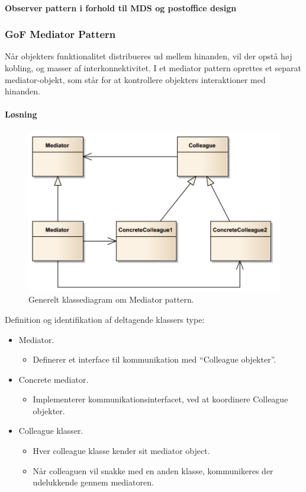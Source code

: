 \paragraph{Observer pattern i forhold til MDS og postoffice design}

\subsubsection{GoF Mediator Pattern}
Når objekters funktionalitet distribueres ud mellem hinanden, vil der opstå høj kobling, og masser af interkonnektivitet.  I et mediator pattern oprettes et separat mediator-objekt, som står for at kontrollere objekters interaktioner med hinanden. 

\paragraph{Løsning}

\begin{figure}[h]
	\centering
	\includegraphics[width=0.8\linewidth]{figs/spm5/concrete}
	\caption{Generelt klassediagram om Mediator pattern.}
	\label{fig:concrete}
\end{figure}

Definition og identifikation af deltagende klassers type:

\begin{itemize}
	\item Mediator.
	\begin{itemize}
		\item Definerer et interface til kommunikation med “Colleague objekter”.
	\end{itemize}
	\item Concrete mediator.
	\begin{itemize}
		\item 	Implementerer kommunikationsinterfacet, ved at koordinere Colleague objekter.
	\end{itemize}
	\item Colleague klasser.
	\begin{itemize}
		\item Hver colleague klasse kender sit mediator object.
		\item Når colleaguen vil snakke med en anden klasse, kommunikeres der udelukkende gennem mediatoren.
	\end{itemize}
\end{itemize}

